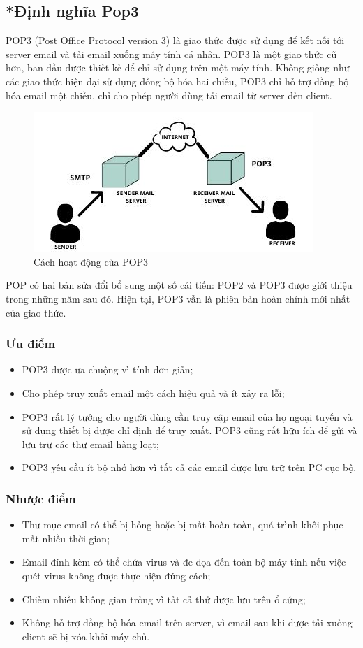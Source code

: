 \documentclass[APA,STIX1COL]{WileyNJD-v2}
\begin{document}
\subsection*{*Định nghĩa Pop3}
POP3 (Post Office Protocol version 3) là giao thức được sử dụng để kết nối tới server email và tải email xuống máy tính cá nhân. POP3 là một giao thức cũ hơn, ban đầu được thiết kế để chỉ sử dụng trên một máy tính. Không giống như các giao thức hiện đại sử dụng đồng bộ hóa hai chiều, POP3 chỉ hỗ trợ đồng bộ hóa email một chiều, chỉ cho phép người dùng tải email từ server đến client.
\begin{figure}[h]
  \centering
  \includegraphics[scale=0.7]{POP3}
  \caption{Cách hoạt động của POP3}
  \label{fig:pop3}
\end{figure}



POP có hai bản sửa đổi bổ sung một số cải tiến: POP2 và POP3 được giới thiệu trong những năm sau đó. Hiện tại, POP3 vẫn là phiên bản hoàn chỉnh mới nhất của giao thức.
\subsubsection*{Ưu điểm}
\begin{itemize}
  \item POP3 được ưa chuộng vì tính đơn giản;
  \item Cho phép truy xuất email một cách hiệu quả và ít xảy ra lỗi;
  \item POP3 rất lý tưởng cho người dùng cần truy cập email của họ ngoại tuyến và sử dụng thiết bị được chỉ định để truy xuất. POP3 cũng rất hữu ích để gửi và lưu trữ các thư email hàng loạt;
  \item POP3 yêu cầu ít bộ nhớ hơn vì tất cả các email được lưu trữ trên PC cục bộ.
\end{itemize}

\subsubsection*{Nhược điểm}
\begin{itemize}
  \item Thư mục email có thể bị hỏng hoặc bị mất hoàn toàn, quá trình khôi phục mất nhiều thời gian;
  \item Email đính kèm có thể chứa virus và đe dọa đến toàn bộ máy tính nếu việc quét virus không được thực hiện đúng cách;
  \item Chiếm nhiều không gian trống vì tất cả thử được lưu trên ổ cứng;
  \item Không hỗ trợ đồng bộ hóa email trên server, vì email sau khi được tải xuống client sẽ bị xóa khỏi máy chủ.
\end{itemize}
\end{document}
